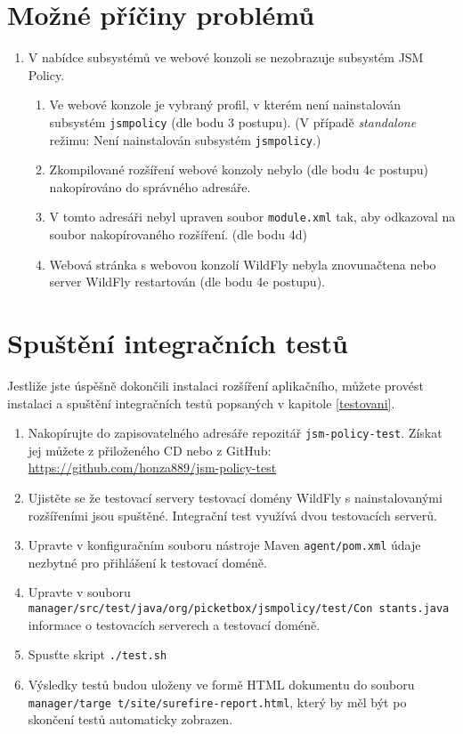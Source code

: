 \begin{enumerate}
\end{enumerate}


\section{Možné příčiny problémů}
\begin{enumerate}
    \item V nabídce subsystémů ve webové konzoli se nezobrazuje subsystém JSM Policy.
    \begin{enumerate}
        \item Ve webové konzole je vybraný profil, v kterém není nainstalován subsystém {\tt jsmpolicy} (dle bodu 3 postupu). (V případě {\it standalone} režimu: Není nainstalován subsystém {\tt jsmpolicy}.)
        \item Zkompilované rozšíření webové konzoly nebylo (dle bodu 4c postupu) nakopírováno do správného adresáře.
        \item V tomto adresáři nebyl upraven soubor {\tt module.xml} tak, aby odkazoval na soubor nakopírovaného rozšíření. (dle bodu 4d)
        \item Webová stránka s webovou konzolí WildFly nebyla znovunačtena nebo server WildFly restartován (dle bodu 4e postupu).
    \end{enumerate}
\end{enumerate}


\section{Spuštění integračních testů}

Jestliže jste úspěšně dokončili instalaci rozšíření aplikačního, můžete provést instalaci a spuštění integračních testů popsaných v kapitole \ref{testovani}.

\begin{enumerate}
  \item Nakopírujte do zapisovatelného adresáře repozitář {\tt jsm-policy-test}. Získat jej můžete z přiloženého CD nebo z GitHub:
    \newline\url{https://github.com/honza889/jsm-policy-test}
  \item Ujistěte se že testovací servery testovací domény WildFly s nainstalovanými rozšířeními jsou spuštěné. Integrační test využívá dvou testovacích serverů.
  \item Upravte v konfiguračním souboru nástroje Maven {\tt agent/pom.xml} údaje nezbytné pro přihlášení k testovací doméně.
  \item Upravte v souboru {\tt manager/src/test/java/org/picketbox/jsmpolicy/test/Con stants.java} informace o testovacích serverech a testovací doméně.
  \item Spusťte skript {\tt ./test.sh}
  \item Výsledky testů budou uloženy ve formě HTML dokumentu do souboru {\tt manager/targe t/site/surefire-report.html}, který by měl být po skončení testů automaticky zobrazen.
\end{enumerate}

